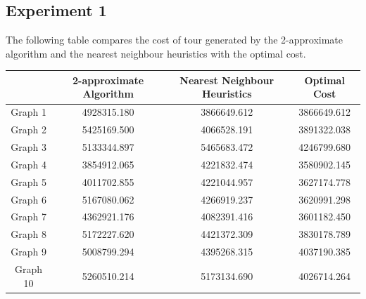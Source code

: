 \documentclass[paper=a4, fontsize=11pt]{scrartcl}	%
\numberwithin{equation}{section}		%
\numberwithin{figure}{section}			%
\numberwithin{table}{section}				%
\begin{document}
\subsection{Experiment 1}
The following table compares the cost of tour generated by the 2-approximate algorithm and the nearest neighbour heuristics with the optimal cost.
\begin{center}

\begin{tabular}{|c|c|c|c|}
\hline 
 & 2-approximate Algorithm & Nearest Neighbour Heuristics & Optimal Cost \\ 
\hline 
Graph 1 & 4928315.180 & 3866649.612 & 3866649.612 \\ 
\hline 
Graph 2 & 5425169.500 & 4066528.191 & 3891322.038 \\ 
\hline 
Graph 3 & 5133344.897 & 5465683.472 & 4246799.680 \\ 
\hline 
Graph 4 & 3854912.065 & 4221832.474 & 3580902.145 \\ 
\hline 
Graph 5 & 4011702.855 & 4221044.957 & 3627174.778 \\ 
\hline 
Graph 6 & 5167080.062 & 4266919.237 & 3620991.298 \\ 
\hline 
Graph 7 & 4362921.176 & 4082391.416 & 3601182.450 \\ 
\hline 
Graph 8 & 5172227.620 & 4421372.309 & 3830178.789 \\ 
\hline 
Graph 9 & 5008799.294 & 4395268.315 & 4037190.385 \\ 
\hline 
Graph 10 & 5260510.214 & 5173134.690 & 4026714.264 \\ 
\hline 
\end{tabular} 
\end{center}
\end{document}
